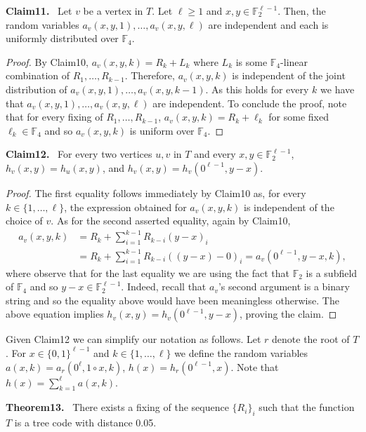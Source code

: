 \documentclass[10pt,a4paper]{article}
\newenvironment{authorclaim}[1]{\par\medskip\noindent\textbf{#1.}\ \ignorespaces}{\par\medskip}
\begin{document}
\begin{authorclaim}{Claim11}
Let $v$ be a vertex in $T$. Let $\ell\ge1$ and $x,y\in\mathbb F_2^{\ell-1}$. Then, the random variables $a_v(x,y,1),\ldots,a_v(x,y,\ell)$ are independent and each is uniformly distributed over $\mathbb F_4$.
\end{authorclaim}
\begin{proof}
By Claim10, $a_v(x,y,k)=R_k+L_k$ where $L_k$ is some $\mathbb F_4$-linear combination of $R_1,\ldots,R_{k-1}$. Therefore, $a_v(x,y,k)$ is independent of the joint distribution of $a_v(x,y,1),\ldots,a_v(x,y,k-1)$. As this holds for every $k$ we have that $a_v(x,y,1),\ldots,a_v(x,y,\ell)$ are independent. To conclude the proof, note that for every fixing of $R_1,\ldots,R_{k-1}$, $a_v(x,y,k)=R_k+\ell_k$ for some fixed $\ell_k\in\mathbb F_4$ and so $a_v(x,y,k)$ is uniform over $\mathbb F_4$.
\end{proof}
\begin{authorclaim}{Claim12}
For every two vertices $u,v$ in $T$ and every $x,y\in\mathbb F_2^{\ell-1}$, $h_v(x,y)=h_u(x,y)$, and $h_v(x,y)=h_v(0^{\ell-1},y-x)$.
\end{authorclaim}
\begin{proof}
The first equality follows immediately by Claim10 as, for every $k\in\{1,\ldots,\ell\}$, the expression obtained for $a_v(x,y,k)$ is independent of the choice of $v$. As for the second asserted equality, again by Claim10,
\begin{align*}
a_v(x,y,k)&=R_k+\sum_{i=1}^{k-1}R_{k-i}(y-x)_i\\
&=R_k+\sum_{i=1}^{k-1}R_{k-i}((y-x)-0)_i
=a_v(0^{\ell-1},y-x,k),
\end{align*}
where observe that for the last equality we are using the fact that $\mathbb F_2$ is a subfield of $\mathbb F_4$ and so $y-x\in\mathbb F_2^{\ell-1}$. Indeed, recall that $a_v$'s second argument is a binary string and so the equality above would have been meaningless otherwise. The above equation implies $h_v(x,y)=h_v(0^{\ell-1},y-x)$, proving the claim.
\end{proof}
Given Claim12 we can simplify our notation as follows. Let $r$ denote the root of $T$. For $x\in\{0,1\}^{\ell-1}$ and $k\in\{1,\ldots,\ell\}$ we define the random variables $a(x,k)=a_r(0^\ell,1\circ x,k)$, $h(x)=h_r(0^{\ell-1},x)$. Note that $h(x)=\sum_{k=1}^\ell a(x,k)$.
\begin{authorclaim}{Theorem13}
There exists a fixing of the sequence $\{R_i\}_i$ such that the function $T$ is a tree code with distance 0.05.
\end{authorclaim}
\end{document}
